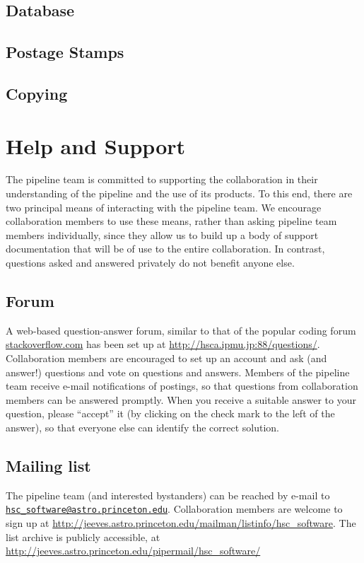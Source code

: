 \documentclass[12pt]{article}
\def\email#1{\href{mailto:#1}{\nolinkurl{#1}}}
\begin{document}
\subsection{Database}
\subsection{Postage Stamps}
\subsection{Copying}




\section{Help and Support}
\label{sec:support}

The pipeline team is committed to supporting the collaboration in their understanding of the pipeline and the
use of its products.  To this end, there are two principal means of interacting with the pipeline team.  We
encourage collaboration members to use these means, rather than asking pipeline team members individually,
since they allow us to build up a body of support documentation that will be of use to the entire
collaboration.  In contrast, questions asked and answered privately do not benefit anyone else.

\subsection{Forum}

A web-based question-answer forum, similar to that of the popular coding forum \url{stackoverflow.com} has
been set up at \url{http://hsca.ipmu.jp:88/questions/}.  Collaboration members are encouraged to set up an
account and ask (and answer!) questions and vote on questions and answers.  Members of the pipeline team
receive e-mail notifications of postings, so that questions from collaboration members can be answered
promptly.  When you receive a suitable answer to your question, please ``accept'' it (by clicking on the check
mark to the left of the answer), so that everyone else can identify the correct solution.

\subsection{Mailing list}

The pipeline team (and interested bystanders) can be reached by e-mail to
\email{hsc_software@astro.princeton.edu}.  Collaboration members are welcome to sign up at
\url{http://jeeves.astro.princeton.edu/mailman/listinfo/hsc_software}.  The list archive is publicly
accessible, at \url{http://jeeves.astro.princeton.edu/pipermail/hsc_software/}
\end{document}
